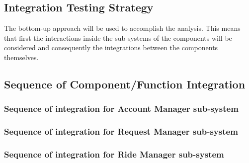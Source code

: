 \documentclass[a4paper,11pt]{report} %
\begin{document}
	\subsection{Integration Testing Strategy}
		The bottom-up approach will be used to accomplish the analysis. This means that first the interactions inside the sub-systems of the components will be considered and consequently the integrations between the components themselves.
	\subsection{Sequence of Component/Function Integration}
		\subsubsection{Sequence of integration for Account Manager sub-system}
			\begin{minipage}{\linewidth}
			\end{minipage}
			
		\subsubsection{Sequence of integration for Request Manager sub-system}
		\begin{minipage}{\linewidth}
		\end{minipage}
		
		\subsubsection{Sequence of integration for Ride Manager sub-system}
		\begin{minipage}{\linewidth}
		\end{minipage}
		
\end{document}
